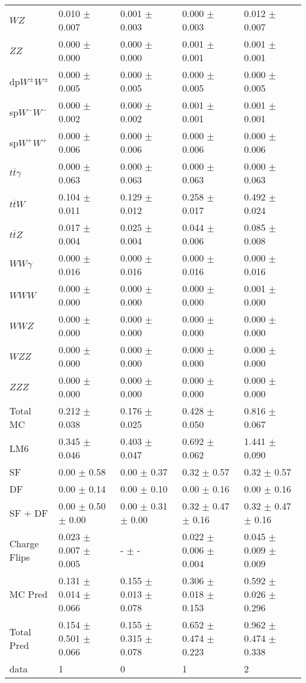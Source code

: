 \begin{tabular}{l | l l l l}
$WZ$ &  0.010 $\pm$  0.007 &  0.001 $\pm$  0.003 &   0.000 $\pm$  0.003 &  0.012 $\pm$  0.007\\
$ZZ$ &  0.000 $\pm$   0.000 &  0.000 $\pm$   0.000 &  0.001 $\pm$  0.001 &  0.001 $\pm$  0.001\\
\hline
dp$W^{\pm}W^{\pm}$ &  0.000 $\pm$  0.005 &  0.000 $\pm$  0.005 &  0.000 $\pm$  0.005 &  0.000 $\pm$  0.005\\
sp$W^{-}W^{-}$ &  0.000 $\pm$  0.002 &  0.000 $\pm$  0.002 &  0.001 $\pm$  0.001 &  0.001 $\pm$  0.001\\
sp$W^{+}W^{+}$ &  0.000 $\pm$  0.006 &  0.000 $\pm$  0.006 &  0.000 $\pm$  0.006 &  0.000 $\pm$  0.006\\
$t\overline{t}\gamma$ &  0.000 $\pm$  0.063 &  0.000 $\pm$  0.063 &  0.000 $\pm$  0.063 &  0.000 $\pm$  0.063\\
$t\overline{t}W$ &  0.104 $\pm$  0.011 &  0.129 $\pm$  0.012 &  0.258 $\pm$  0.017 &  0.492 $\pm$  0.024\\
$t\overline{t}Z$ &  0.017 $\pm$  0.004 &  0.025 $\pm$  0.004 &  0.044 $\pm$  0.006 &  0.085 $\pm$  0.008\\
$WW\gamma$ &  0.000 $\pm$  0.016 &  0.000 $\pm$  0.016 &  0.000 $\pm$  0.016 &  0.000 $\pm$  0.016\\
$WWW$ &   0.000 $\pm$   0.000 &   0.000 $\pm$   0.000 &   0.000 $\pm$   0.000 &  0.001 $\pm$   0.000\\
$WWZ$ &  0.000 $\pm$   0.000 &  0.000 $\pm$   0.000 &  0.000 $\pm$   0.000 &  0.000 $\pm$   0.000\\
$WZZ$ &   0.000 $\pm$   0.000 &  0.000 $\pm$   0.000 &   0.000 $\pm$   0.000 &   0.000 $\pm$   0.000\\
$ZZZ$ &  0.000 $\pm$   0.000 &  0.000 $\pm$   0.000 &   0.000 $\pm$   0.000 &   0.000 $\pm$   0.000\\
\hline
Total MC &  0.212 $\pm$  0.038 &  0.176 $\pm$  0.025 &  0.428 $\pm$  0.050 &  0.816 $\pm$  0.067\\
\hline\hline
\hline
LM6 &  0.345 $\pm$  0.046 &  0.403 $\pm$  0.047 &  0.692 $\pm$  0.062 &  1.441 $\pm$  0.090\\
\hline\hline
\hline\hline
 SF  & 0.00 $\pm$ 0.58 & 0.00 $\pm$ 0.37 & 0.32 $\pm$ 0.57 & 0.32 $\pm$ 0.57\\
 DF  & 0.00 $\pm$ 0.14 & 0.00 $\pm$ 0.10 & 0.00 $\pm$ 0.16 & 0.00 $\pm$ 0.16\\
\hline
 SF + DF  & 0.00 $\pm$ 0.50 $\pm$ 0.00 & 0.00 $\pm$ 0.31 $\pm$ 0.00 & 0.32 $\pm$ 0.47 $\pm$ 0.16 & 0.32 $\pm$ 0.47 $\pm$ 0.16\\
\hline\hline
Charge Flips & 0.023 $\pm$ 0.007 $\pm$ 0.005 & - $\pm$ - & 0.022 $\pm$ 0.006 $\pm$ 0.004 & 0.045 $\pm$ 0.009 $\pm$ 0.009\\
\hline\hline
\hline
MC Pred &  0.131 $\pm$  0.014 $\pm$  0.066 &  0.155 $\pm$  0.013 $\pm$  0.078 &  0.306 $\pm$  0.018 $\pm$  0.153 &  0.592 $\pm$  0.026 $\pm$  0.296\\
\hline\hline
Total Pred &  0.154 $\pm$  0.501 $\pm$  0.066 &  0.155 $\pm$  0.315 $\pm$  0.078 &  0.652 $\pm$  0.474 $\pm$  0.223 &  0.962 $\pm$  0.474 $\pm$  0.338\\
\hline\hline
data & 1 & 0 & 1 & 2\\
\hline\hline
\end{tabular}
